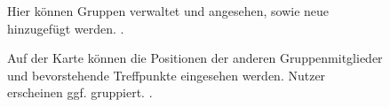 \documentclass[parskip=full,11pt]{scrartcl}
\begin{document}
\begin{figure}[hb]
	\caption{\label{fig:groups}
		Hier können Gruppen verwaltet und angesehen, sowie neue hinzugefügt werden.
		.
	}
\end{figure}

\begin{figure}[hb]
		\caption{\label{fig:map}
			Auf der Karte können die Positionen der anderen Gruppenmitglieder und bevorstehende
			Treffpunkte eingesehen werden. Nutzer erscheinen ggf. gruppiert.
			.
		}
\end{figure}
\end{document}
